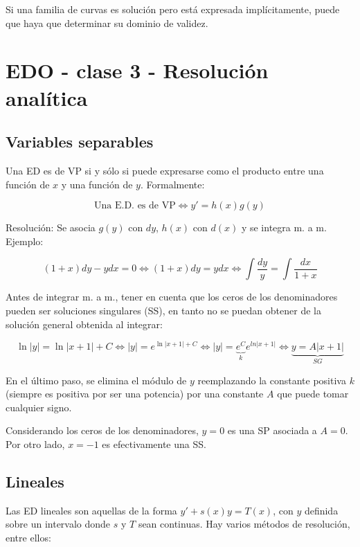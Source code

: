 \documentclass{article}
\begin{document}
Si una familia de curvas es solución pero está expresada implícitamente, puede que haya que determinar su dominio de validez.

\section{EDO - clase 3 - Resolución analítica}

\subsection{Variables separables}

Una ED es de VP si y sólo si puede expresarse como el producto entre una función de $x$ y una función de $y$. Formalmente:

\begin{equation}
\text{Una E.D. es de VP} \Leftrightarrow y' = h(x) g(y)
\end{equation}

Resolución: Se asocia $g(y)$ con $dy$, $h(x)$ con $d(x)$ y se integra m. a m. Ejemplo:

\begin{equation}
(1+x) dy - y dx = 0 \Leftrightarrow (1+x) dy = y dx \Leftrightarrow \int \frac{dy}{y} = \int \frac{dx}{1+x}
\end{equation}

Antes de integrar m. a m., tener en cuenta que los ceros de los denominadores pueden ser soluciones singulares (SS), en tanto no se puedan obtener de la solución general obtenida al integrar:

\begin{equation}
\ln |y| = \ln |x + 1| + C \Leftrightarrow |y| = e^{\ln |x+1| + C } \Leftrightarrow |y| = \underbrace{e^C}_{k} e^{ln |x+1|} \Leftrightarrow \underbrace{y = A |x+1|}_{SG}
\end{equation}

En el último paso, se elimina el módulo de $y$ reemplazando la constante positiva $k$ (siempre es positiva por ser una potencia) por una constante $A$ que puede tomar cualquier signo.

Considerando los ceros de los denominadores, $y = 0$ es una SP asociada a $A = 0$. Por otro lado, $x = -1$ es efectivamente una SS.

\subsection{Lineales}

Las ED lineales son aquellas de la forma $y' + s(x) y = T(x)$, con $y$ definida sobre un intervalo donde $s$ y $T$ sean continuas. Hay varios métodos de resolución, entre ellos:
\end{document}
